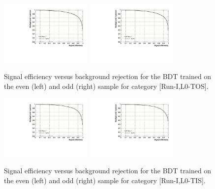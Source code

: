 \begin{figure}[h]
\centering
\includegraphics[height=!,width=0.4\textwidth]{figs/TMVA/BDTG_Data_run1_t0_even/rejBvsS.pdf}
\includegraphics[height=!,width=0.4\textwidth]{figs/TMVA/BDTG_Data_run1_t0_odd/rejBvsS.pdf}
\caption{Signal efficiency versus background rejection for the BDT trained on the even (left) and odd (right) sample for category [Run-I,\textsf{L0-TOS}].}

\includegraphics[height=!,width=0.4\textwidth]{figs/TMVA/BDTG_Data_run1_t1_even/rejBvsS.pdf}
\includegraphics[height=!,width=0.4\textwidth]{figs/TMVA/BDTG_Data_run1_t1_odd/rejBvsS.pdf}
\caption{Signal efficiency versus background rejection for the BDT trained on the even (left) and odd (right) sample for category [Run-I,\textsf{L0-TIS}].}


\end{figure}
